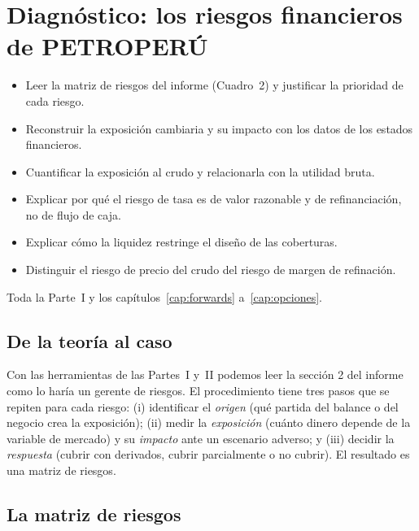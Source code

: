 \chapter{Diagnóstico: los riesgos financieros de PETROPERÚ}\label{cap:diagnostico}

\begin{objetivos}
\begin{itemize}
\item Leer la matriz de riesgos del informe (Cuadro~2) y justificar la prioridad de cada riesgo.
\item Reconstruir la exposición cambiaria y su impacto con los datos de los estados financieros.
\item Cuantificar la exposición al crudo y relacionarla con la utilidad bruta.
\item Explicar por qué el riesgo de tasa es de valor razonable y de refinanciación, no de flujo de caja.
\item Explicar cómo la liquidez restringe el diseño de las coberturas.
\item Distinguir el riesgo de precio del crudo del riesgo de margen de refinación.
\end{itemize}
\end{objetivos}

\begin{prerreq}Toda la Parte~I y los capítulos~\ref{cap:forwards} a~\ref{cap:opciones}.\end{prerreq}

\section{De la teoría al caso}

Con las herramientas de las Partes~I y~II podemos leer la sección 2 del informe como lo haría un gerente de riesgos. El procedimiento tiene tres pasos que se repiten para cada riesgo: (i) identificar el \emph{origen} (qué partida del balance o del negocio crea la exposición); (ii) medir la \emph{exposición} (cuánto dinero depende de la variable de mercado) y su \emph{impacto} ante un escenario adverso; y (iii) decidir la \emph{respuesta} (cubrir con derivados, cubrir parcialmente o no cubrir). El resultado es una matriz de riesgos.

\section{La matriz de riesgos}

